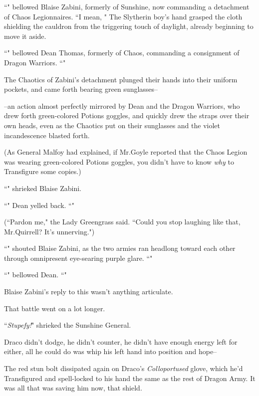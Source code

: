 ``" bellowed Blaise Zabini, formerly of Sunshine, now commanding a detachment of Chaos Legionnaires. ``I mean, " The Slytherin boy's hand grasped the cloth shielding the cauldron from the triggering touch of daylight, already beginning to move it aside.

``" bellowed Dean Thomas, formerly of Chaos, commanding a consignment of Dragon Warriors. ``"

The Chaotics of Zabini's detachment plunged their hands into their uniform pockets, and came forth bearing green sunglasses\---

\---an action almost perfectly mirrored by Dean and the Dragon Warriors, who drew forth green-colored Potions goggles, and quickly drew the straps over their own heads, even as the Chaotics put on their sunglasses and the violet incandescence blasted forth.

(As General Malfoy had explained, if Mr.\?Goyle reported that the Chaos Legion was wearing green-colored Potions goggles, you didn't have to know \emph{why} to Transfigure some copies.)

``" shrieked Blaise Zabini.

``" Dean yelled back. ``"

(``Pardon me," the Lady Greengrass said. ``Could you stop laughing like that, Mr.\?Quirrell? It's unnerving.")

``" shouted Blaise Zabini, as the two armies ran headlong toward each other through omnipresent eye-searing purple glare. ``"

``" bellowed Dean. ``"

Blaise Zabini's reply to this wasn't anything articulate.

That battle went on a lot longer.

\later

``\emph{Stupefy!}" shrieked the Sunshine General.

Draco didn't dodge, he didn't counter, he didn't have enough energy left for either, all he could do was whip his left hand into position and hope\---

The red stun bolt dissipated again on Draco's \emph{Colloportused} glove, which he'd Transfigured and spell-locked to his hand the same as the rest of Dragon Army. It was all that was saving him now, that shield.

